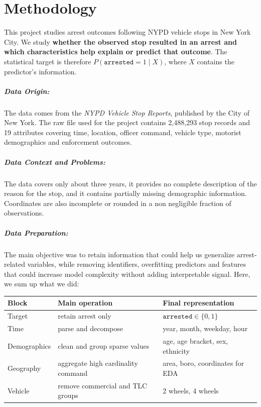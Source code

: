 \chapter{Methodology}

This project studies arrest outcomes following NYPD vehicle stops in New York City. We study \textbf{whether the observed stop resulted in an arrest and which characteristics help explain or predict that outcome}. The statistical target is therefore $P(\texttt{arrested}=1 \mid X)$, where $X$ contains the predictor's information.

\paragraph{Data Origin:} The data comes from the \textit{NYPD Vehicle Stop Reports}, published by the City of New York. The raw file used for the project contains 2,488,293 stop records and 19 attributes covering time, location, officer command, vehicle type, motorist demographics and enforcement outcomes.

\paragraph{Data Context and Problems:} The data covers only about three years, it provides no complete description of the reason for the stop, and it contains partially missing demographic information. Coordinates are also incomplete or rounded in a non negligible fraction of observations. 

\paragraph{Data Preparation:} The main objective was to retain information that could help us generalize arrest-related variables, while removing identifiers, overfitting predictors and features that could increase model complexity without adding interpretable signal. Here, we sum up what we did:

\begin{center}
\begin{tabular}{lll}
\hline
\textbf{Block} & \textbf{Main operation} & \textbf{Final representation} \\
\hline
Target  & retain arrest only & $\texttt{arrested}\in\{0,1\}$ \\
Time & parse and decompose & year, month, weekday, hour \\
Demographics & clean and group sparse values & age, age bracket, sex, ethnicity \\
Geography & aggregate high cardinality command & area, boro, coordinates for EDA \\
Vehicle & remove commercial and TLC groups & 2 wheels, 4 wheels \\
\hline
\end{tabular}
\end{center}

